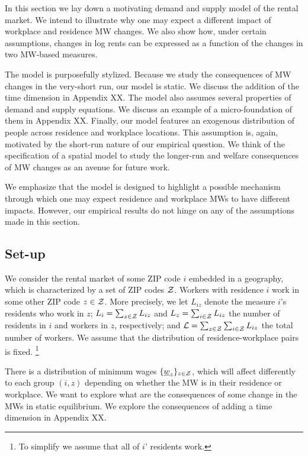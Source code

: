 
In this section we lay down a motivating demand and supply model of the rental market. 
We intend to illustrate why one may expect a different impact of workplace and residence
MW changes.
We also show how, under certain assumptions, changes in log rents can be expressed as a 
function of the changes in two MW-based measures.

The model is purposefully stylized.
Because we study the consequences of MW changes in the very-short run, our model is 
static. We discuss the addition of the time dimension in Appendix XX.
The model also assumes several properties of demand and supply equations. We discuss
an example of a micro-foundation of them in Appendix XX.
Finally, our model features an exogenous distribution of people across residence and 
workplace locations. This assumption is, again, motivated by the short-run nature of our 
empirical question.
We think of the specification of a spatial model to study the longer-run and welfare 
consequences of MW changes as an avenue for future work.

We emphasize that the model is designed to highlight a possible mechanism through which 
one may expect residence and workplace MWs to have different impacts. 
However, our empirical results do not hinge on any of the assumptions made in this 
section.

\subsection{Set-up}

We consider the rental market of some ZIP code $i$ embedded in a geography, which is 
characterized by a set of ZIP codes $\mathcal{Z}$.
Workers with residence $i$ work in some other ZIP code $z\in\mathcal{Z}$. More precisely, we let 
$L_{iz}$ denote the measure $i$'s residents who work in $z$;
$L_i = \sum_{z \in \mathcal{Z}} L_{iz}$ and $L_z = \sum_{i \in \mathcal{Z}} L_{iz}$ 
the number of residents in $i$ and workers in $z$, respectively;
and $\mathcal{L}=\sum_{z \in \mathcal{Z}}\sum_{i \in \mathcal{Z}}L_{iz}$ the total number of workers. 
We assume that the distribution of residence-workplace pairs is fixed.%
\footnote{To simplify we assume that all of $i$' residents work.}

There is a distribution of minimum wages $\{\underline{w}_z\}_{z\in\mathcal{Z}}$, which will affect 
differently to each group $(i,z)$ depending on whether the MW is in their residence or 
workplace. 
We want to explore what are the consequences of some change in the MWs in static 
equilibrium. We explore the consequences of adding a time dimension in Appendix XX.

